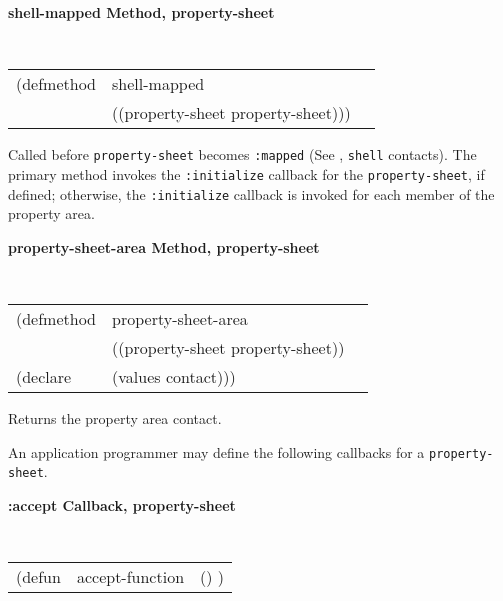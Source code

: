 {\samepage
{\large {\bf shell-mapped \hfill Method, property-sheet}}
\begin{flushright} \parbox[t]{6.125in}{
\tt
\begin{tabular}{lll}
\raggedright
(defmethod & shell-mapped & \\
& ((property-sheet  property-sheet)))
\end{tabular}
\rm

}\end{flushright}}


\begin{flushright} \parbox[t]{6.125in}{ Called before {\tt property-sheet} becomes
{\tt :mapped} (See \cite{clue}, {\tt shell} contacts).  The primary
method
invokes the {\tt :initialize} callback for the {\tt property-sheet}, if defined;
otherwise, the {\tt :initialize} callback is invoked for each member of the
property area.  }\end{flushright}




{\samepage
{\large {\bf property-sheet-area \hfill Method, property-sheet}}
\begin{flushright} \parbox[t]{6.125in}{
\tt
\begin{tabular}{lll}
\raggedright
(defmethod & property-sheet-area & \\
& ((property-sheet  property-sheet))\\
(declare & (values contact)))
\end{tabular}
\rm

}\end{flushright}}


\begin{flushright} \parbox[t]{6.125in}{Returns the property area
contact.}\end{flushright}








An application programmer may define the following callbacks for
a {\tt property-sheet}.

{\samepage
{\large {\bf :accept \hfill Callback, property-sheet}} 
\begin{flushright} 
\parbox[t]{6.125in}{
\tt
\begin{tabular}{lll}
\raggedright
(defun & accept-function & () )
\end{tabular}
\rm

}\end{flushright}}

